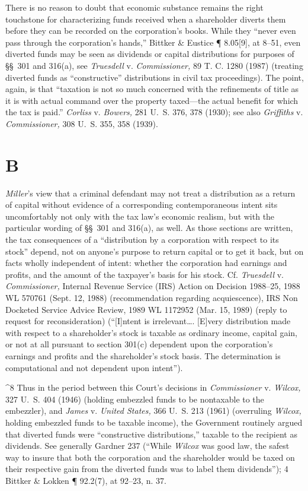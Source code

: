   There is no reason to doubt that economic substance remains the
right touchstone for characterizing funds received when a shareholder
diverts them before they can be recorded on the corporation's books.
While they ``never even pass through the corporation's hands,''
Bittker \& Eustice ¶ 8.05[9], at 8--51, even diverted funds may be
seen as dividends or capital distributions for purposes of \S\S~301
and 316(a), see \emph{Truesdell} v. \emph{Commissioner,} 89 T. C. 1280
(1987) (treating diverted funds as ``constructive'' distributions
in civil tax proceedings). The point, again, is that ``taxation
is not so much concerned with the refinements of title as it is with
actual command over the property taxed---the actual benefit for which
the tax is paid.'' \emph{Corliss} v. \emph{Bowers,} 281 U.~S. 376, 378
(1930); see also \emph{Griffiths} v. \emph{Commissioner,} 308 U.~S. 355, 358
(1939).\footnotemark[8]

\section{B}

  \emph{Miller}'s view that a criminal defendant may not treat
a distribution as a return of capital without evidence of a
cor\newpage responding contemporaneous intent sits uncomfortably not only
with the tax law's economic realism, but with the particular wording
of \S\S~301 and 316(a), as well. As those sections are written, the
tax consequences of a ``distribution by a corporation with respect to
its stock'' depend, not on anyone's purpose to return capital or to
get it back, but on facts wholly independent of intent: whether the
corporation had earnings and profits, and the amount of the taxpayer's
basis for his stock. Cf. \emph{Truesdell} v. \emph{Commissioner,} Internal
Revenue Service (IRS) Action on Decision 1988--25, 1988 WL 570761
(Sept. 12, 1988) (recommendation regarding acquiescence), IRS Non
Docketed Service Advice Review, 1989 WL 1172952 (Mar. 15, 1989) (reply
to request for reconsideration) (``[I]ntent is irrelevant\dots .
[E]very distribution made with respect to a shareholder's stock is
taxable as ordinary income, capital gain, or not at all pursuant to
section 301(c) dependent upon the corporation's earnings and profits
and the shareholder's stock basis. The determination is computational
and not dependent upon intent'').

^8 Thus in the period between this Court's decisions in
\emph{Commissioner} v. \emph{Wilcox,} 327 U.~S. 404 (1946) (holding
embezzled funds to be nontaxable to the embezzler), and \emph{James} v.
\emph{United States,} 366 U.~S. 213 (1961) (overruling \emph{Wilcox,} holding
embezzled funds to be taxable income), the Government routinely
argued that diverted funds were ``constructive distributions,''
taxable to the recipient as dividends. See generally Gardner 237
(``While \emph{Wilcox} was good law, the safest way to insure that both
the corporation and the shareholder would be taxed on their respective
gain from the diverted funds was to label them dividends''); 4 Bittker
\& Lokken ¶ 92.2(7), at 92--23, n. 37.

